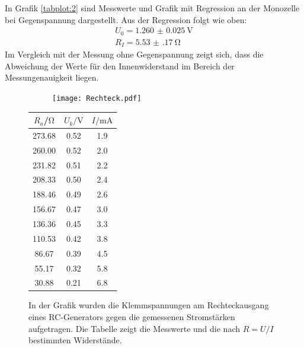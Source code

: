 In Grafik \ref{tabplot:2} sind Messwerte und Grafik mit Regression an der Monozelle bei Gegenspannung
dargestellt. Aus der Regression folgt wie oben:
\begin{equation*}
  \begin{split}
    U_0 = \SI{1.260(25)}{\volt}\\
    R_I = \SI{5.53(17)}{\ohm}
  \end{split}
\end{equation*}
Im Vergleich mit der Messung ohne Gegenspannung zeigt sich, dass die Abweichung der Werte für den Innenwiderstand
im Bereich der Messungenauigkeit liegen.
\begin{figure}[h]
  \begin{subfigure}{0.74\textwidth}
  \centering
    \texttt{[image: Rechteck.pdf]}
    \label{sub:5}
    \qquad
  \end{subfigure}
  \begin{subtable}{0.25\textwidth}
  \centering
    \begin{tabular}{c c c}
    \toprule
    $R_a$/$\si{\ohm}$ & $U_{k}/\si{\volt}$ & $I/\si{\milli\ampere}$ \\
    \midrule
    273.68 & 0.52 & 1.9 \\
    260.00 & 0.52 & 2.0 \\
    231.82 & 0.51 & 2.2 \\
    208.33 & 0.50 & 2.4 \\
    188.46 & 0.49 & 2.6 \\
    156.67 & 0.47 & 3.0 \\
    136.36 & 0.45 & 3.3 \\
    110.53 & 0.42 & 3.8 \\
    86.67 & 0.39 & 4.5 \\
    55.17 & 0.32 & 5.8 \\
    30.88 & 0.21 & 6.8 \\
    \bottomrule
    \end{tabular}
    \label{sub:6}
    \qquad
  \end{subtable}
  \caption{In der Grafik wurden die Klemmspannungen am Rechteckausgang eines RC-Generators
  gegen die gemessenen Stromstärken aufgetragen. Die Tabelle zeigt die Messwerte und die
   nach $R = U/I$ bestimmten Widerstände.}
  \label{tabplot:3}
\end{figure}

